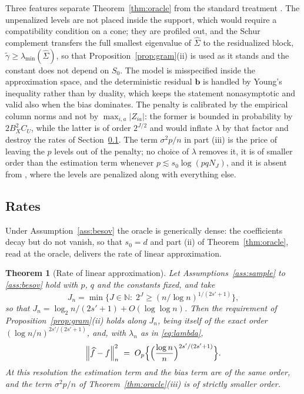 \documentclass[12pt]{article} %
\newtheorem{theorem}{Theorem}
\theoremstyle{definition}
\newcommand{\normn}[1]{\left\lVert #1 \right\rVert_{n}}
\newcommand{\NJ}{N_{J}}
\newcommand{\Gramhat}{\widehat{\Sigma}}
\newcommand{\pen}{\lambda}
\newcommand{\penn}{\lambda_{n}}
\newcommand{\Szero}{S_{0}}
\newcommand{\seff}{s'}
\newcommand{\bb}{\mathbf{b}}
\newcommand{\gtil}{\widetilde{\gamma}}
\newcommand{\lmin}{\lambda_{\min}}
\begin{document}
Three features separate Theorem~\ref{thm:oracle} from the standard treatment
\citep[Chapter 6]{buhlmann2011statistics}. The unpenalized levels are not
placed inside the support, which would require a compatibility condition on a
cone; they are profiled out, and the Schur complement transfers the full
smallest eigenvalue of $\Gramhat$ to the residualized block,
$\gtil \ge \lmin(\Gramhat)$, so that Proposition~\ref{prop:gram}(ii) is used
as it stands and the constant does not depend on $\Szero$. The model is
misspecified inside the \textcolor{colR1}{approximation space}, and the deterministic residual $\bb$ is handled
by Young's inequality rather than by duality, which keeps the statement
nonasymptotic and valid also when the bias dominates. The penalty is
calibrated by the empirical column norms and not by $\max_{i,a}|Z_{ia}|$: the
former is bounded in probability by $2B_X^2C_U$, while the latter is of order
$2^{J/2}$ and would inflate $\pen$ by that factor and destroy the rates of
Section~\ref{sec:rates}. The term $\sigma^{2}p/n$ in part (iii) is the price
of leaving the $p$ levels out of the penalty; no choice of $\pen$ removes it,
it is of smaller order than the estimation term whenever
$p \lesssim s_0\log(pq\NJ)$, and it is absent from
\citet{Klopp-Pensky-2015}, where the levels are penalized along with
everything else.

\subsection{Rates}
\label{sec:rates}

Under Assumption~\ref{ass:besov} the \textcolor{colR1}{oracle} is generically dense: the
coefficients decay but do not vanish, so that $s_0 = d$ and part (ii) of
Theorem~\ref{thm:oracle}, read at the oracle, delivers the rate of
\textcolor{colR1}{linear approximation}.

\begin{theorem}[Rate of \textcolor{colR1}{linear approximation}]
\label{thm:sieve}
Let Assumptions~\ref{ass:sample} to \ref{ass:besov} hold with $p$, $q$ and the
constants fixed, and take
\begin{equation}
  \label{eq:Jn}
  J_n = \min\bigl\{J \in \mathbb{N} :\;
  2^{J} \ge (n/\log n)^{1/(2\seff+1)}\bigr\},
\end{equation}
so that $J_n = \log_2 n/(2\seff+1) + O(\log\log n)$. Then the requirement of
Proposition~\ref{prop:gram}(ii) holds along $J_n$, being itself of the exact
order $(\log n/n)^{2\seff/(2\seff+1)}$, and, with $\penn$ as in
\eqref{eq:lambda},
\[
  \normn{\widehat{f}-f}^{2}
  \;=\; O_p\Bigl\{\Bigl(\frac{\log n}{n}\Bigr)^{2\seff/(2\seff+1)}\Bigr\} .
\]
At this resolution the estimation term and the bias term are of the same
order, and the term $\sigma^{2}p/n$ of Theorem~\ref{thm:oracle}(iii) is of
strictly smaller order.
\end{theorem}
\end{document}
